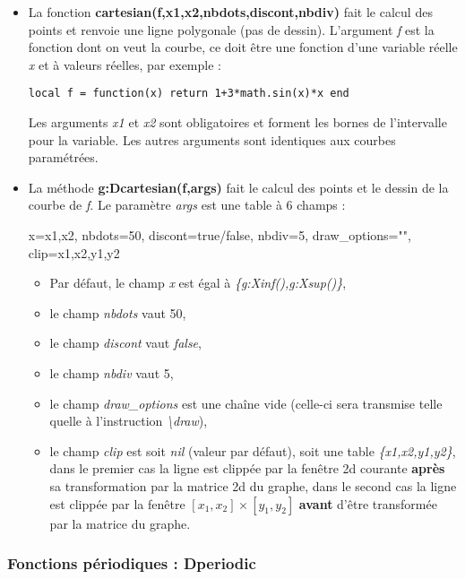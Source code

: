 \begin{itemize}
\item La fonction \textbf{cartesian(f,x1,x2,nbdots,discont,nbdiv)} fait le calcul des points et renvoie une ligne polygonale (pas de dessin). L'argument \emph{f} est la fonction dont on veut la courbe, ce doit être une fonction d'une variable réelle \emph{x} et à valeurs réelles, par exemple :

    \texttt{local f = function(x) return 1+3*math.sin(x)*x end}

    Les arguments \emph{x1} et \emph{x2} sont obligatoires et forment les bornes de l'intervalle pour la variable. Les autres arguments sont identiques aux courbes paramétrées.

\item La méthode \textbf{g:Dcartesian(f,args)} fait le calcul des points et le dessin de la courbe de \emph{f}. Le paramètre \emph{args} est une table à 6 champs :

\begin{TeXcode}
  { x={x1,x2}, nbdots=50, discont=true/false, nbdiv=5, draw_options="", clip={x1,x2,y1,y2} }
\end{TeXcode}
  
  \begin{itemize}
      \item   Par défaut, le champ \emph{x} est égal à \emph{\{g:Xinf(),g:Xsup()\}}, 
      \item le champ \emph{nbdots} vaut 50, 
      \item le champ \emph{discont} vaut \emph{false}, 
      \item le champ \emph{nbdiv} vaut 5, 
      \item le champ \emph{draw\_options} est une chaîne vide (celle-ci sera transmise telle quelle à l'instruction \emph{\textbackslash draw}),
      \item le champ \emph{clip} est soit \emph{nil} (valeur par défaut), soit une table \emph{\{x1,x2,y1,y2\}}, dans le premier cas la ligne est clippée par la fenêtre 2d courante \textbf{après} sa transformation par la matrice 2d du graphe, dans le second cas la ligne est clippée par la fenêtre $[x_1,x_2]\times[y_1,y_2]$ \textbf{avant} d'être transformée par la matrice du graphe.
  \end{itemize}
\end{itemize}

\subsubsection{Fonctions périodiques : Dperiodic}

